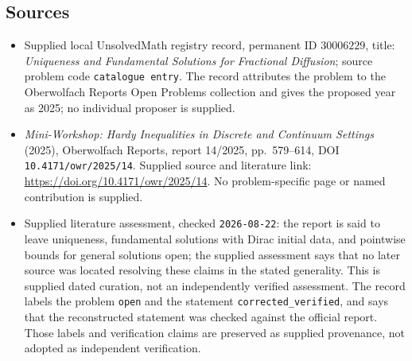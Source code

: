 \documentclass[11pt]{article}
\begin{document}
\subsection{Sources}
\begin{itemize}
\item Supplied local UnsolvedMath registry record, permanent ID \(30006229\), title: \emph{Uniqueness and Fundamental Solutions for Fractional Diffusion}; source problem code \texttt{catalogue entry}. The record attributes the problem to the Oberwolfach Reports Open Problems collection and gives the proposed year as 2025; no individual proposer is supplied.
\item \emph{Mini-Workshop: Hardy Inequalities in Discrete and Continuum Settings} (2025), Oberwolfach Reports, report 14/2025, pp.\ 579--614, DOI \texttt{10.4171/owr/2025/14}. Supplied source and literature link: \url{https://doi.org/10.4171/owr/2025/14}. No problem-specific page or named contribution is supplied.
\item Supplied literature assessment, checked \texttt{2026-08-22}: the report is said to leave uniqueness, fundamental solutions with Dirac initial data, and pointwise bounds for general solutions open; the supplied assessment says that no later source was located resolving these claims in the stated generality. This is supplied dated curation, not an independently verified assessment. The record labels the problem \texttt{open} and the statement \texttt{corrected\_verified}, and says that the reconstructed statement was checked against the official report. Those labels and verification claims are preserved as supplied provenance, not adopted as independent verification.
\end{itemize}
\end{document}
